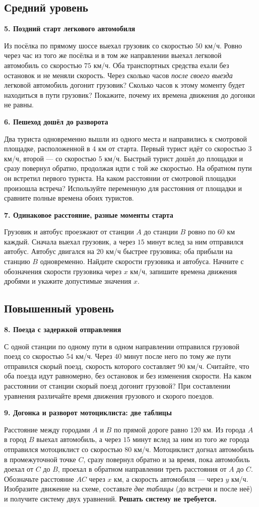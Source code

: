\documentclass[a4paper,12pt]{article}
\newcommand{\task}[2]{\Needspace{9\baselineskip}\par\noindent\textbf{\textcolor{darkaccent}{#1.} #2}\par}
\begin{document}
\subsection*{Средний уровень}
\task{5}{Поздний старт легкового автомобиля}
Из посёлка по прямому шоссе выехал грузовик со скоростью $50$ км/ч. Ровно через час из того же посёлка и в том же направлении выехал легковой автомобиль со скоростью $75$ км/ч. Оба транспортных средства ехали без остановок и не меняли скорость. Через сколько часов \emph{после своего выезда} легковой автомобиль догонит грузовик? Сколько часов к этому моменту будет находиться в пути грузовик? Покажите, почему их времена движения до догонки не равны.

\task{6}{Пешеход дошёл до разворота}
Два туриста одновременно вышли из одного места и направились к смотровой площадке, расположенной в $4$ км от старта. Первый турист идёт со скоростью $3$ км/ч, второй --- со скоростью $5$ км/ч. Быстрый турист дошёл до площадки и сразу повернул обратно, продолжая идти с той же скоростью. На обратном пути он встретил первого туриста. На каком расстоянии от смотровой площадки произошла встреча? Используйте переменную для расстояния от площадки и сравните полные времена обоих туристов.

\task{7}{Одинаковое расстояние, разные моменты старта}
Грузовик и автобус проезжают от станции $A$ до станции $B$ ровно по $60$ км каждый. Сначала выехал грузовик, а через $15$ минут вслед за ним отправился автобус. Автобус двигался на $20$ км/ч быстрее грузовика; оба прибыли на станцию $B$ одновременно. Найдите скорости грузовика и автобуса. Начните с обозначения скорости грузовика через $x$ км/ч, запишите времена движения дробями и укажите допустимые значения $x$.

\clearpage
{}\subsection*{Повышенный уровень}
\task{8}{Поезда с задержкой отправления}
С одной станции по одному пути в одном направлении отправился грузовой поезд со скоростью $54$ км/ч. Через $40$ минут после него по тому же пути отправился скорый поезд, скорость которого составляет $90$ км/ч. Считайте, что оба поезда идут равномерно, без остановок и без изменения скорости. На каком расстоянии от станции скорый поезд догонит грузовой? При составлении уравнения различайте время движения грузового и скорого поездов.

\task{9}{Догонка и разворот мотоциклиста: две таблицы}
Расстояние между городами $A$ и $B$ по прямой дороге равно $120$ км. Из города $A$ в город $B$ выехал автомобиль, а через $15$ минут вслед за ним из того же города отправился мотоциклист со скоростью $80$ км/ч. Мотоциклист догнал автомобиль в промежуточной точке $C$, сразу повернул обратно и за время, пока автомобиль доехал от $C$ до $B$, проехал в обратном направлении треть расстояния от $A$ до $C$. Обозначьте расстояние $AC$ через $x$ км, а скорость автомобиля --- через $y$ км/ч. Изобразите движение на схеме, составьте \emph{две таблицы} (до встречи и после неё) и получите систему двух уравнений. \textbf{Решать систему не требуется.}
\end{document}
